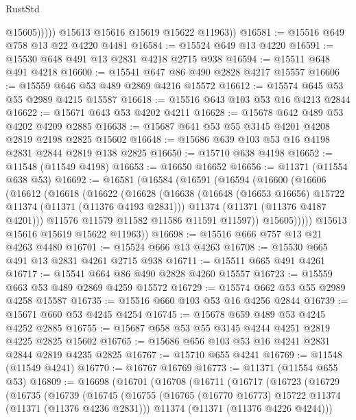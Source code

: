 \begin{lexlean}{RustStd}
\begin{coremodule}
{\begin{coremodule}
{{{{{{{{{{{{{{{{{{{{{{{{{{{{{{{{{                  @15605)))))
        @15613
        @15616
        @15619
        @15622
        @11963))
@16581 := @15516 @649 @758 @13 @22 @4220 @4481
@16584 := @15524 @649 @13 @4220
@16591 := @15530 @648 @491 @13 @2831 @4218 @2715 @938
@16594 := @15511 @648 @491 @4218
@16600 := @15541 @647 @86 @490 @2828 @4217 @15557
@16606 := @15559 @646 @53 @489 @2869 @4216 @15572
@16612 := @15574 @645 @53 @55 @2989 @4215 @15587
@16618 := @15516 @643 @103 @53 @16 @4213 @2844
@16622 := @15671 @643 @53 @4202 @4211
@16628 := @15678 @642 @489 @53 @4202 @4209 @2885
@16638 := @15687 @641 @53 @55 @3145 @4201 @4208 @2819 @2198 @2825 @15602
@16648 := @15686 @639 @103 @53 @16 @4198 @2831 @2844 @2819 @138 @2825
@16650 := @15710 @638 @4198
@16652 := @11548 (@11549 @4198)
@16653 := @16650 @16652
@16656 := @11371 (@11554 @638 @53)
@16692 := @16581
    (@16584
      (@16591
        (@16594
          (@16600
            (@16606
              (@16612
                (@16618
                  (@16622
                    (@16628
                      (@16638
                        (@16648 (@16653 @16656) @15722 @11374 (@11371 (@11376 @4193 @2831)))
                        @11374
                        (@11371 (@11376 @4187 @4201)))
                      @11576
                      @11579
                      @11582
                      @11586
                      @11591
                      @11597))
                  @15605)))))
        @15613
        @15616
        @15619
        @15622
        @11963))
@16698 := @15516 @666 @757 @13 @21 @4263 @4480
@16701 := @15524 @666 @13 @4263
@16708 := @15530 @665 @491 @13 @2831 @4261 @2715 @938
@16711 := @15511 @665 @491 @4261
@16717 := @15541 @664 @86 @490 @2828 @4260 @15557
@16723 := @15559 @663 @53 @489 @2869 @4259 @15572
@16729 := @15574 @662 @53 @55 @2989 @4258 @15587
@16735 := @15516 @660 @103 @53 @16 @4256 @2844
@16739 := @15671 @660 @53 @4245 @4254
@16745 := @15678 @659 @489 @53 @4245 @4252 @2885
@16755 := @15687 @658 @53 @55 @3145 @4244 @4251 @2819 @4225 @2825 @15602
@16765 := @15686 @656 @103 @53 @16 @4241 @2831 @2844 @2819 @4235 @2825
@16767 := @15710 @655 @4241
@16769 := @11548 (@11549 @4241)
@16770 := @16767 @16769
@16773 := @11371 (@11554 @655 @53)
@16809 := @16698
    (@16701
      (@16708
        (@16711
          (@16717
            (@16723
              (@16729
                (@16735
                  (@16739
                    (@16745
                      (@16755
                        (@16765 (@16770 @16773) @15722 @11374 (@11371 (@11376 @4236 @2831)))
                        @11374
                        (@11371 (@11376 @4226 @4244)))
}}}}}}}}}}}}}}}}}}}}}}}}}}}}}}}}}
\end{coremodule}}
\end{coremodule}
\end{lexlean}
